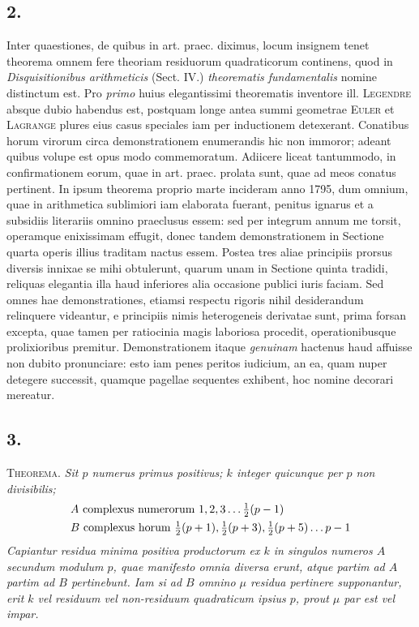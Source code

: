 \documentclass[twoside,12pt, showframe]{memoir}
\let\oldfrac\frac
\def\frac#1#2{\mathchoice{\tfrac{#1}{#2}}{\oldfrac{#1}{#2}}{\genfrac{}{}{}{2}{#1}{#2\mathstrut}}{\genfrac{}{}{}{3}{#1}{#2\mathstrut}}}
\begin{document}
\subsection*{2.}
 
Inter quaestiones, de quibus in art. praec. diximus, locum insignem tenet theorema omnem fere theoriam residuorum quadraticorum continens, quod in \textit{Disquisitionibus arithmeticis} (Sect. IV.) \textit{theorematis fundamentalis} nomine distinctum\clearpage\noindent%
est. Pro \textit{primo} huius elegantissimi theorematis inventore ill. \textsc{Legendre} absque dubio habendus est, postquam longe antea summi geometrae \textsc{Euler} et \textsc{Lagrange} plures eius casus speciales iam per inductionem detexerant. Conatibus horum virorum circa demonstrationem enumerandis hic non immoror; adeant quibus volupe est opus modo commemoratum. Adiicere liceat tantummodo, in confirmationem eorum, quae in art. praec. prolata sunt, quae ad meos conatus pertinent. In ipsum theorema proprio marte incideram anno 1795, dum omnium, quae in arithmetica sublimiori iam elaborata fuerant, penitus ignarus et a subsidiis literariis omnino praeclusus essem: sed per integrum annum me torsit, operamque enixissimam effugit, donec tandem demonstrationem in Sectione quarta operis illius traditam nactus essem. Postea tres aliae principiis prorsus diversis innixae se mihi obtulerunt, quarum unam in Sectione quinta tradidi, reliquas elegantia illa haud inferiores alia occasione publici iuris faciam. Sed omnes hae demonstrationes, etiamsi respectu rigoris nihil desiderandum relinquere videantur, e principiis nimis heterogeneis derivatae sunt, prima forsan excepta, quae tamen per ratiocinia magis laboriosa procedit, operationibusque prolixioribus premitur. Demonstrationem itaque \textit{genuinam} hactenus haud affuisse non dubito pronunciare: esto iam penes peritos iudicium, an ea, quam nuper detegere successit, quamque pagellae sequentes exhibent, hoc nomine decorari mereatur.

\subsection*{3.}
 
\textsc{Theorema.} \textit{Sit \(p\) numerus primus positivus; \(k\) integer quicunque per \(p\) non divisibilis;
\[\begin{aligned}
&A \text{ complexus numerorum }1,2,3 \ldots \frac{1}{2}(p-1)\\
&B \text{ complexus horum } \frac{1}{2}(p+1), \frac{1}{2}(p+3), \frac{1}{2}(p+5) \ldots p-1
\end{aligned}\]
Capiantur residua minima positiva productorum ex \(k\) in singulos numeros \(A\) secundum modulum \(p\), quae manifesto omnia diversa erunt, atque partim ad \(A\) partim ad \(B\) pertinebunt. Iam si ad \(B\) omnino \(\mu\) residua pertinere supponantur, erit \(k\) vel residuum vel non-residuum quadraticum ipsius \(p\), prout \(\mu\) par est vel impar.}
 
\end{document}
